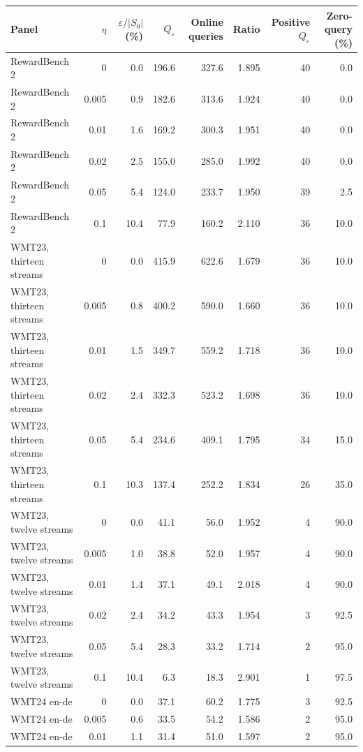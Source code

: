 \begin{table}[t]
\centering\small\setlength{\tabcolsep}{4pt}
\begin{tabular}{lrrrrrrr}
\toprule
Panel & $\eta$ & $\varepsilon/|S_0|$ (\%) & $Q_\varepsilon$ & Online queries & Ratio & Positive $Q_\varepsilon$ & Zero-query (\%) \\
\midrule
RewardBench 2 & 0 & 0.0 & 196.6 & 327.6 & 1.895 & 40 & 0.0 \\
RewardBench 2 & 0.005 & 0.9 & 182.6 & 313.6 & 1.924 & 40 & 0.0 \\
RewardBench 2 & 0.01 & 1.6 & 169.2 & 300.3 & 1.951 & 40 & 0.0 \\
RewardBench 2 & 0.02 & 2.5 & 155.0 & 285.0 & 1.992 & 40 & 0.0 \\
RewardBench 2 & 0.05 & 5.4 & 124.0 & 233.7 & 1.950 & 39 & 2.5 \\
RewardBench 2 & 0.1 & 10.4 & 77.9 & 160.2 & 2.110 & 36 & 10.0 \\
\addlinespace
WMT23, thirteen streams & 0 & 0.0 & 415.9 & 622.6 & 1.679 & 36 & 10.0 \\
WMT23, thirteen streams & 0.005 & 0.8 & 400.2 & 590.0 & 1.660 & 36 & 10.0 \\
WMT23, thirteen streams & 0.01 & 1.5 & 349.7 & 559.2 & 1.718 & 36 & 10.0 \\
WMT23, thirteen streams & 0.02 & 2.4 & 332.3 & 523.2 & 1.698 & 36 & 10.0 \\
WMT23, thirteen streams & 0.05 & 5.4 & 234.6 & 409.1 & 1.795 & 34 & 15.0 \\
WMT23, thirteen streams & 0.1 & 10.3 & 137.4 & 252.2 & 1.834 & 26 & 35.0 \\
\addlinespace
WMT23, twelve streams & 0 & 0.0 & 41.1 & 56.0 & 1.952 & 4 & 90.0 \\
WMT23, twelve streams & 0.005 & 1.0 & 38.8 & 52.0 & 1.957 & 4 & 90.0 \\
WMT23, twelve streams & 0.01 & 1.4 & 37.1 & 49.1 & 2.018 & 4 & 90.0 \\
WMT23, twelve streams & 0.02 & 2.4 & 34.2 & 43.3 & 1.954 & 3 & 92.5 \\
WMT23, twelve streams & 0.05 & 5.4 & 28.3 & 33.2 & 1.714 & 2 & 95.0 \\
WMT23, twelve streams & 0.1 & 10.4 & 6.3 & 18.3 & 2.901 & 1 & 97.5 \\
\addlinespace
WMT24 en-de & 0 & 0.0 & 37.1 & 60.2 & 1.775 & 3 & 92.5 \\
WMT24 en-de & 0.005 & 0.6 & 33.5 & 54.2 & 1.586 & 2 & 95.0 \\
WMT24 en-de & 0.01 & 1.1 & 31.4 & 51.0 & 1.597 & 2 & 95.0 \\

\end{tabular}
\end{table}
